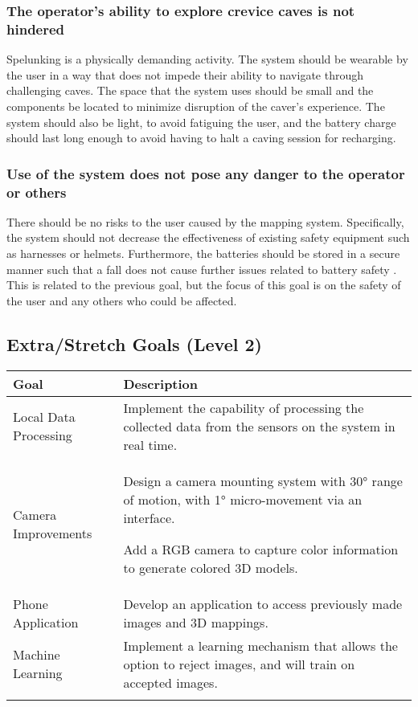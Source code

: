 \documentclass[11pt]{article}
\begin{document}
	\subsubsection{The operator's ability to explore crevice caves is not hindered}
		Spelunking is a physically demanding activity. The system should be wearable by the user in a way that does not impede their ability to navigate through challenging caves. The space that the system uses should be small and the components be located to minimize disruption of the caver's experience. The system should also be light, to avoid fatiguing the user, and the battery charge should last long enough to avoid having to halt a caving session for recharging.
	\subsubsection{Use of the system does not pose any danger to the operator or others}
		There should be no risks to the user caused by the mapping system. Specifically, the system should not decrease the effectiveness of existing safety equipment such as harnesses or helmets. Furthermore, the batteries should be stored in a secure manner such that a fall does not cause further issues related to battery safety . This is related to the previous goal, but the focus of this goal is on the safety of the user and any others who could be affected.
	\pagebreak
	\subsection{Extra/Stretch Goals (Level 2)} %
		\begin{tabularx}{\textwidth}{X p{}}
			\toprule
			\textbf{Goal} & \textbf{Description}
			\\
			\toprule
			Local Data Processing & Implement the capability of processing the collected data from the sensors on the system in real time.
			\\
			\midrule
			Camera Improvements & Design a camera mounting system with 30° range of motion, with 1° micro-movement via an interface. 
			
			Add a RGB camera to capture color information to generate colored 3D models.
			\\
			\midrule
			Phone Application & Develop an application to access previously made images and 3D mappings.
			\\
			\midrule
			Machine Learning & Implement a learning mechanism that allows the option to reject images, and will train on accepted images. 
			\\
			\bottomrule
			\caption{Stretch goals and detailed description}
		\end{tabularx}
		
\end{document}
